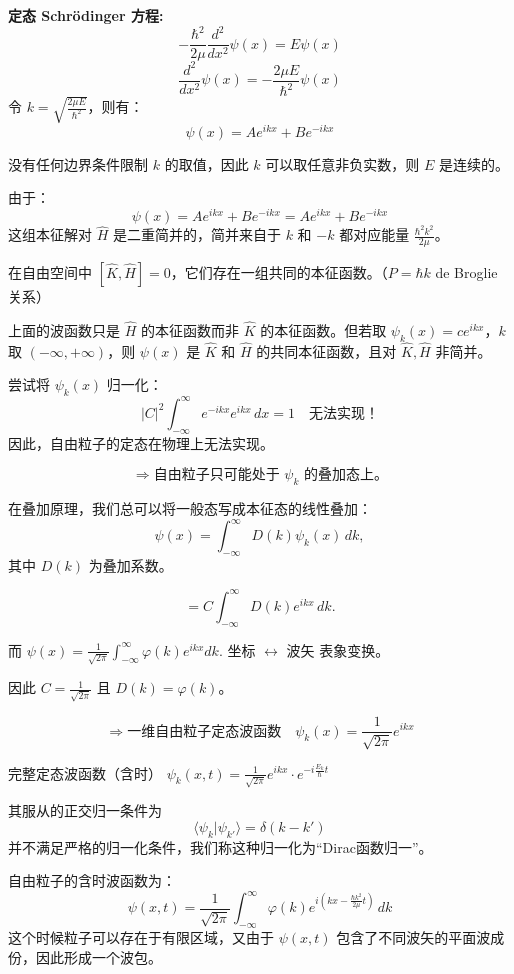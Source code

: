 \documentclass[lang=cn,10pt]{elegantbook}
\begin{document}
\textbf{定态 Schr\"{o}dinger 方程:}
\[
-\frac{\hbar^2}{2\mu} \frac{d^2}{dx^2} \psi(x) = E \psi(x)
\]
\[
\frac{d^2}{dx^2} \psi(x) = -\frac{2\mu E}{\hbar^2} \psi(x)
\]
令 \( k = \sqrt{\frac{2\mu E}{\hbar^2}} \)，则有：
\[
\psi(x) = A e^{ikx} + B e^{-ikx}
\]

没有任何边界条件限制 \( k \) 的取值，因此 \( k \) 可以取任意非负实数，则 \( E \) 是连续的。

由于：
\[
\psi(x) = A e^{ikx} + B e^{-ikx} = A e^{ikx} + B e^{-ikx}
\]
这组本征解对 \( \hat{H} \) 是二重简并的，简并来自于 \( k \) 和 \( -k \) 都对应能量 \( \frac{\hbar^2 k^2}{2\mu} \)。

在自由空间中 $[\hat{K}, \hat{H}] = 0$，它们存在一组共同的本征函数。（$P = \hbar k$ de Broglie 关系）

上面的波函数只是 $\hat{H}$ 的本征函数而非 $\hat{K}$ 的本征函数。但若取 $\psi_k(x) = c e^{ikx}$，$k$ 取 $(-\infty, +\infty)$，则 $\psi(x)$ 是 $\hat{K}$ 和 $\hat{H}$ 的共同本征函数，且对 $\hat{K}, \hat{H}$ 非简并。

尝试将 $\psi_k(x)$ 归一化：
\[
|C|^2 \int_{-\infty}^{\infty} e^{-ikx} e^{ikx} \, dx = 1 \quad \text{无法实现！}
\]
因此，自由粒子的定态在物理上无法实现。

\[
\Rightarrow \text{自由粒子只可能处于 } \psi_k \text{ 的叠加态上。}
\]

在叠加原理，我们总可以将一般态写成本征态的线性叠加：
\[
\psi(x) = \int_{-\infty}^{\infty} D(k) \psi_k(x) \, dk,
\]
其中 $D(k)$ 为叠加系数。

\[
= C \int_{-\infty}^{\infty} D(k) e^{ikx} \, dk.
\]

而 $\psi(x) = \frac{1}{\sqrt{2\pi}} \int_{-\infty}^{\infty} \varphi(k) e^{ikx} dk$. 坐标 $\leftrightarrow$ 波矢 表象变换。

因此 $C = \frac{1}{\sqrt{2\pi}}$ 且 $D(k) = \varphi(k)$。

\[
	\Rightarrow \text{一维自由粒子定态波函数} \quad \psi_k(x) = \frac{1}{\sqrt{2\pi}} e^{ikx}
	\]
	
	完整定态波函数（含时） $\psi_k(x,t) = \frac{1}{\sqrt{2\pi}} e^{ikx} \cdot e^{-i\frac{E_k}{\hbar}t}$

其服从的正交归一条件为
\[
	\langle \psi_k | \psi_{k'} \rangle = \delta(k-k')
\]
并不满足严格的归一化条件，我们称这种归一化为“Dirac函数归一”。

自由粒子的含时波函数为：
\[
\psi(x,t) = \frac{1}{\sqrt{2\pi}} \int_{-\infty}^{\infty} \varphi(k) e^{i(kx - \frac{\hbar k^2}{2\mu}t)} \, dk
\]
这个时候粒子可以存在于有限区域，又由于 $\psi(x,t)$ 包含了不同波矢的平面波成份，因此形成一个波包。
\end{document}
